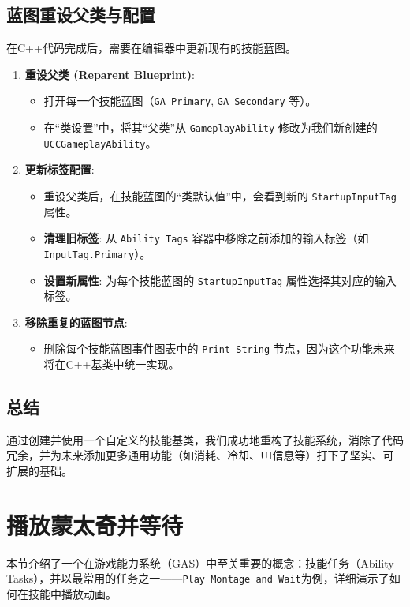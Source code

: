 \documentclass[10pt,CJKmath]{zhbook-v1}
\begin{document}
\subsection{蓝图重设父类与配置}
在C++代码完成后，需要在编辑器中更新现有的技能蓝图。
\begin{enumerate}
    \item \textbf{重设父类 (Reparent Blueprint)}:
    \begin{itemize}
        \item 打开每一个技能蓝图（\texttt{GA\_Primary}, \texttt{GA\_Secondary} 等）。
        \item 在“类设置”中，将其“父类”从 \texttt{GameplayAbility} 修改为我们新创建的 \texttt{UCCGameplayAbility}。
    \end{itemize}
    \item \textbf{更新标签配置}:
    \begin{itemize}
        \item 重设父类后，在技能蓝图的“类默认值”中，会看到新的 \texttt{StartupInputTag} 属性。
        \item \textbf{清理旧标签}: 从 \texttt{Ability Tags} 容器中移除之前添加的输入标签（如 \texttt{InputTag.Primary}）。
        \item \textbf{设置新属性}: 为每个技能蓝图的 \texttt{StartupInputTag} 属性选择其对应的输入标签。
    \end{itemize}
    \item \textbf{移除重复的蓝图节点}:
    \begin{itemize}
        \item 删除每个技能蓝图事件图表中的 \texttt{Print String} 节点，因为这个功能未来将在C++基类中统一实现。
    \end{itemize}
\end{enumerate}

\subsection{总结}
通过创建并使用一个自定义的技能基类，我们成功地重构了技能系统，消除了代码冗余，并为未来添加更多通用功能（如消耗、冷却、UI信息等）打下了坚实、可扩展的基础。

\section{播放蒙太奇并等待}
本节介绍了一个在游戏能力系统（GAS）中至关重要的概念：技能任务（Ability Tasks），并以最常用的任务之一——\texttt{Play Montage and Wait}为例，详细演示了如何在技能中播放动画。
\end{document}

